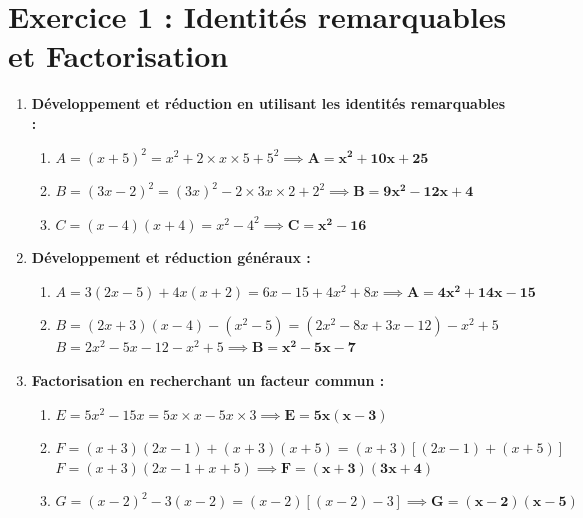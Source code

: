 \documentclass[12pt,a4paper]{article}
\begin{document}
\section*{Exercice 1 : Identités remarquables et Factorisation}
\begin{enumerate}
    \item \textbf{Développement et réduction en utilisant les identités remarquables :}
    \begin{enumerate}
        \item $A = (x + 5)^2 = x^2 + 2 \times x \times 5 + 5^2 \implies \mathbf{A = x^2 + 10x + 25}$
        \item $B = (3x - 2)^2 = (3x)^2 - 2 \times 3x \times 2 + 2^2 \implies \mathbf{B = 9x^2 - 12x + 4}$
        \item $C = (x - 4)(x + 4) = x^2 - 4^2 \implies \mathbf{C = x^2 - 16}$
    \end{enumerate}
    
    \item \textbf{Développement et réduction généraux :}
    \begin{enumerate}
        \item $A = 3(2x - 5) + 4x(x + 2) = 6x - 15 + 4x^2 + 8x \implies \mathbf{A = 4x^2 + 14x - 15}$
        \item $B = (2x + 3)(x - 4) - (x^2 - 5) = (2x^2 - 8x + 3x - 12) - x^2 + 5$ \\
        $B = 2x^2 - 5x - 12 - x^2 + 5 \implies \mathbf{B = x^2 - 5x - 7}$
    \end{enumerate}

    \item \textbf{Factorisation en recherchant un facteur commun :}
    \begin{enumerate}
        \item $E = 5x^2 - 15x = 5x \times x - 5x \times 3 \implies \mathbf{E = 5x(x - 3)}$
        \item $F = (x + 3)(2x - 1) + (x + 3)(x + 5) = (x + 3)[(2x - 1) + (x + 5)]$ \\
        $F = (x + 3)(2x - 1 + x + 5) \implies \mathbf{F = (x + 3)(3x + 4)}$
        \item $G = (x - 2)^2 - 3(x - 2) = (x - 2)[(x - 2) - 3] \implies \mathbf{G = (x - 2)(x - 5)}$
    \end{enumerate}
\end{enumerate}
\end{document}
